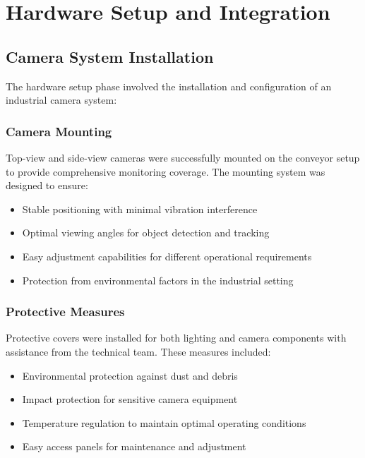 \documentclass{book}
\begin{document}
\section{Hardware Setup and Integration}

\subsection{Camera System Installation}
\par\noindent The hardware setup phase involved the installation and configuration of an industrial camera system:

\subsubsection{Camera Mounting}
\par\noindent Top-view and side-view cameras were successfully mounted on the conveyor setup to provide comprehensive monitoring coverage. The mounting system was designed to ensure:

\begin{itemize}
\item Stable positioning with minimal vibration interference
\item Optimal viewing angles for object detection and tracking
\item Easy adjustment capabilities for different operational requirements
\item Protection from environmental factors in the industrial setting
\end{itemize}

\subsubsection{Protective Measures}
\par\noindent Protective covers were installed for both lighting and camera components with assistance from the technical team. These measures included:

\begin{itemize}
\item Environmental protection against dust and debris
\item Impact protection for sensitive camera equipment
\item Temperature regulation to maintain optimal operating conditions
\item Easy access panels for maintenance and adjustment
\end{itemize}
\end{document}
